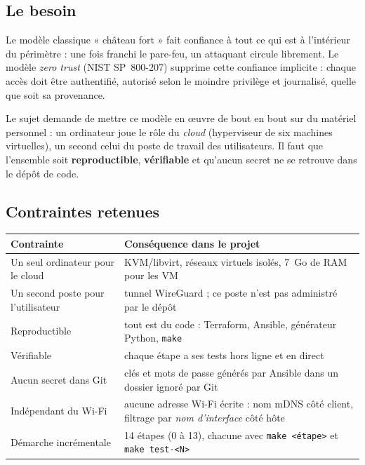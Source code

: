 \documentclass[11pt,a4paper]{article}
\newcommand{\cmd}[1]{\texttt{#1}}
\begin{document}
\subsection{Le besoin}
Le modèle classique « château fort » fait confiance à tout ce qui est à l'intérieur du périmètre :
une fois franchi le pare-feu, un attaquant circule librement. Le modèle \emph{zero trust}
(NIST SP~800-207) supprime cette confiance implicite : chaque accès doit être authentifié,
autorisé selon le moindre privilège et journalisé, quelle que soit sa provenance.

Le sujet demande de mettre ce modèle en œuvre de bout en bout sur du matériel personnel : un
ordinateur joue le rôle du \emph{cloud} (hyperviseur de six machines virtuelles), un second celui
du poste de travail des utilisateurs. Il faut que l'ensemble soit \textbf{reproductible},
\textbf{vérifiable} et qu'aucun secret ne se retrouve dans le dépôt de code.

\subsection{Contraintes retenues}
\begin{center}
\begin{tabularx}{\linewidth}{@{}p{5.2cm}L@{}}
\toprule
\textbf{Contrainte} & \textbf{Conséquence dans le projet}\\
\midrule
Un seul ordinateur pour le cloud & KVM/libvirt, réseaux virtuels isolés, 7~Go de RAM pour les VM\\
Un second poste pour l'utilisateur & tunnel WireGuard ; ce poste n'est pas administré par le dépôt\\
Reproductible & tout est du code : Terraform, Ansible, générateur Python, \cmd{make}\\
Vérifiable & chaque étape a ses tests hors ligne et en direct\\
Aucun secret dans Git & clés et mots de passe générés par Ansible dans un dossier ignoré par Git\\
Indépendant du Wi-Fi & aucune adresse Wi-Fi écrite : nom mDNS côté client, filtrage par \emph{nom d'interface} côté hôte\\
Démarche incrémentale & 14 étapes (0 à 13), chacune avec \cmd{make <étape>} et \cmd{make test-<N>}\\
\bottomrule
\end{tabularx}
\end{center}
\end{document}
